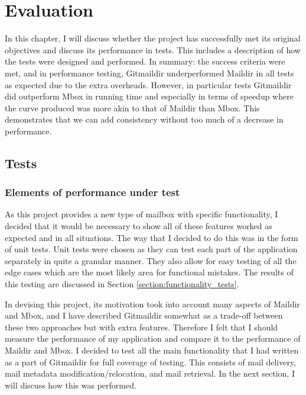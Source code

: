 \chapter{Evaluation} \label{section:evaluation}

In this chapter, I will discuss whether the project has successfully met its original objectives and discuss its performance in tests. This includes a description of how the tests were designed and performed. In summary: the success criteria were met, and in performance testing, Gitmaildir underperformed Maildir in all tests as expected due to the extra overheads. However, in particular tests Gitmaildir did outperform Mbox in running time and especially in terms of speedup where the curve produced was more akin to that of Maildir than Mbox. This demonstrates that we can add consistency without too much of a decrease in performance.

\section{Tests}

\subsection{Elements of performance under test}

As this project provides a new type of mailbox with specific functionality, I decided that it would be necessary to show all of these features worked as expected and in all situations. The way that I decided to do this was in the form of unit tests. Unit tests were chosen as they can test each part of the application separately in quite a granular manner. They also allow for easy testing of all the edge cases which are the most likely area for functional mistakes. The results of this testing are discussed in Section \ref{section:functionality_tests}.

In devising this project, its motivation took into account many aspects of Maildir and Mbox, and I have described Gitmaildir somewhat as a trade-off between these two approaches but with extra features. Therefore I felt that I should measure the performance of my application and compare it to the performance of Maildir and Mbox. I decided to test all the main functionality that I had written as a part of Gitmaildir for full coverage of testing. This consists of mail delivery, mail metadata modification/relocation, and mail retrieval. In the next section, I will discuss how this was performed.

